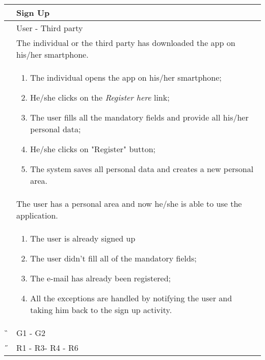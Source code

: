 \begin{center}
	\begin{longtable}{ | p{} | p{} | }
		\hline 
		 \A &  Sign Up \\ 

		\hline
		 \B &  User - Third party \\  %

		\hline
  		 \C &  The individual or the third party has downloaded the app on his/her smartphone.\\ 

		\hline
		 \D & \begin{enumerate}
			\item The individual opens the app on his/her smartphone;
			\item He/she clicks on the \textit{Register here} link;
			\item The user fills all the mandatory fields and provide all his/her personal data;
			\item He/she clicks on "Register" button;
			\item The system saves all personal data and creates a new personal area.
		\end{enumerate} \\

		\hline
		 \E &  The user has a personal area and now he/she is able to use the application.\\

		\hline
		 \F & \begin{enumerate}
			\item The user is already signed up
			\item The user didn’t fill all of the mandatory fields;
			\item The e-mail has already been registered;
			\item All the exceptions are handled by notifying the user and taking him back to the sign up activity.
		\end{enumerate} \\
		
		\hline
		 \G &  G1 - G2\\

		\hline
		 \H &  R1 - R3- R4 - R6 \\
		\hline

	\end{longtable}
\end{center}
